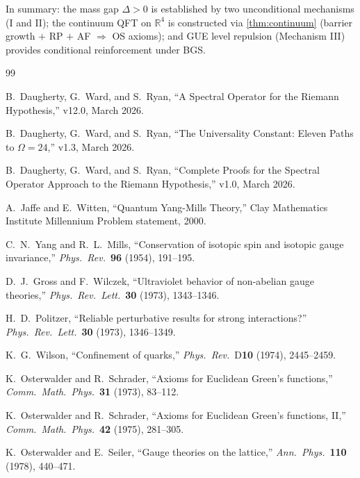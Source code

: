 \documentclass[11pt,a4paper]{article}
\theoremstyle{plain}
\theoremstyle{remark}
\renewcommand{\Omega}{\varOmega}
\newcommand{\R}{\mathbb{R}}
\begin{document}
\noindent
In summary: the mass gap $\Delta > 0$ is established by two unconditional
mechanisms (I and II); the continuum QFT on $\R^4$ is constructed via
\cref{thm:continuum} (barrier growth $+$ RP $+$ AF $\Rightarrow$ OS
axioms); and GUE level repulsion (Mechanism III) provides conditional
reinforcement under BGS.


\begin{thebibliography}{99}

B.~Daugherty, G.~Ward, and S.~Ryan,
``A Spectral Operator for the Riemann Hypothesis,''
v12.0, March 2026.

B.~Daugherty, G.~Ward, and S.~Ryan,
``The Universality Constant: Eleven Paths to $\Omega = 24$,''
v1.3, March 2026.

B.~Daugherty, G.~Ward, and S.~Ryan,
``Complete Proofs for the Spectral Operator Approach to the Riemann
Hypothesis,'' v1.0, March 2026.

A.~Jaffe and E.~Witten,
``Quantum Yang-Mills Theory,''
Clay Mathematics Institute Millennium Problem statement, 2000.

C.~N.~Yang and R.~L.~Mills,
``Conservation of isotopic spin and isotopic gauge invariance,''
\textit{Phys.~Rev.}~\textbf{96} (1954), 191--195.

D.~J.~Gross and F.~Wilczek,
``Ultraviolet behavior of non-abelian gauge theories,''
\textit{Phys.~Rev.~Lett.}~\textbf{30} (1973), 1343--1346.

H.~D.~Politzer,
``Reliable perturbative results for strong interactions?''
\textit{Phys.~Rev.~Lett.}~\textbf{30} (1973), 1346--1349.

K.~G.~Wilson,
``Confinement of quarks,''
\textit{Phys.~Rev.}~D\textbf{10} (1974), 2445--2459.

K.~Osterwalder and R.~Schrader,
``Axioms for Euclidean Green's functions,''
\textit{Comm.~Math.~Phys.}~\textbf{31} (1973), 83--112.

K.~Osterwalder and R.~Schrader,
``Axioms for Euclidean Green's functions, II,''
\textit{Comm.~Math.~Phys.}~\textbf{42} (1975), 281--305.

K.~Osterwalder and E.~Seiler,
``Gauge theories on the lattice,''
\textit{Ann.~Phys.}~\textbf{110} (1978), 440--471.


\end{thebibliography}
\end{document}
